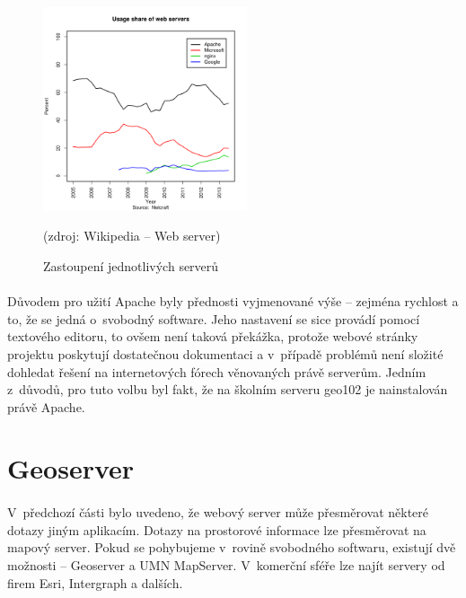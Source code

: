 \documentclass[11pt,a4paper,titlepage,oneside]{book}
\begin{document}


		\begin{figure}[!h]
			\begin{center}
				\includegraphics[width=6cm]{obrazky/servers_share.png}
				\caption{Zastoupení jednotlivých serverů}
				(zdroj: Wikipedia -- Web server\cite{wiki_webServer})
			\end{center}
		\end{figure}

		\paragraph{} Důvodem pro užití Apache byly přednosti vyjmenované výše -- zejména rychlost a to, že se jedná o~svobodný software. Jeho nastavení se sice provádí pomocí textového editoru, to ovšem není taková překážka, protože webové stránky projektu poskytují dostatečnou dokumentaci a v~případě problémů není složité dohledat řešení na internetových fórech věnovaných právě serverům. Jedním z~důvodů, pro tuto volbu byl fakt, že na školním serveru geo102 je nainstalován právě Apache.

	\section{Geoserver}
		\paragraph{} V~předchozí části bylo uvedeno, že webový server může přesměrovat některé dotazy jiným aplikacím. Dotazy na prostorové informace lze přesměrovat na mapový server. Pokud se pohybujeme v~rovině svobodného softwaru, existují dvě možnosti -- Geoserver a UMN MapServer. V~komerční sféře lze najít servery od firem Esri, Intergraph a dalších. 
\end{document}
